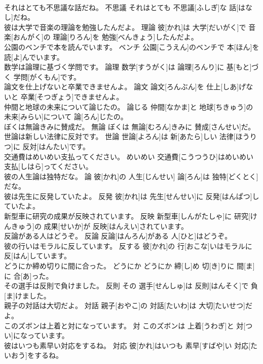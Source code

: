 \documentclass[8pt]{extreport}
\begin{document}
\begin{CJK}{UTF8}{min}
\\	それはとても不思議な話だね。	不思議	それはとても 不思議[ふしぎ]な 話[はなし]だね。	
\\	彼は大学で音楽の理論を勉強したんだよ。	理論	彼[かれ]は 大学[だいがく]で 音楽[おんがく]の 理論[りろん]を 勉強[べんきょう]したんだよ。	
\\	公園のベンチで本を読んでいます。	ベンチ	公園[こうえん]のベンチで 本[ほん]を 読[よ]んでいます。	
\\	数学は論理に基づく学問です。	論理	数学[すうがく]は 論理[ろんり]に 基[もと]づく 学問[がくもん]です。	
\\	論文を仕上げないと卒業できませんよ。	論文	論文[ろんぶん]を 仕上[しあ]げないと 卒業[そつぎょう]できませんよ。	
\\	仲間と地球の未来について論じたの。	論じる	仲間[なかま]と 地球[ちきゅう]の 未来[みらい]について 論[ろん]じたの。	
\\	ぼくは無論きみに賛成だ。	無論	ぼくは 無論[むろん]きみに 賛成[さんせい]だ。	
\\	世論は新しい法律に反対です。	世論	世論[よろん]は 新[あたら]しい 法律[ほうりつ]に 反対[はんたい]です。	
\\	交通費はめいめい支払ってください。	めいめい	交通費[こうつうひ]はめいめい 支払[しはら]ってください。	
\\	彼の人生論は独特だな。	論	彼[かれ]の 人生[じんせい] 論[ろん]は 独特[どくとく]だな。	
\\	彼は先生に反発していたよ。	反発	彼[かれ]は 先生[せんせい]に 反発[はんぱつ]していたよ。	
\\	新型車に研究の成果が反映されています。	反映	新型車[しんがたしゃ]に 研究[けんきゅう]の 成果[せいか]が 反映[はんえい]されています。	
\\	反論がある人はどうぞ。	反論	反論[はんろん]がある 人[ひと]はどうぞ。	
\\	彼の行いはモラルに反しています。	反する	彼[かれ]の 行[おこな]いはモラルに 反[はん]しています。	
\\	どうにか締め切りに間に合った。	どうにか	どうにか 締[し]め 切[き]りに 間[ま]に 合[あ]った。	
\\	その選手は反則で負けました。	反則	その 選手[せんしゅ]は 反則[はんそく]で 負[ま]けました。	
\\	親子の対話は大切だよ。	対話	親子[おやこ]の 対話[たいわ]は 大切[たいせつ]だよ。	
\\	このズボンは上着と対になっています。	対	このズボンは 上着[うわぎ]と 対[つい]になっています。	
\\	彼はいつも素早い対応をするね。	対応	彼[かれ]はいつも 素早[すばや]い 対応[たいおう]をするね。	

\end{CJK}
\end{document}
